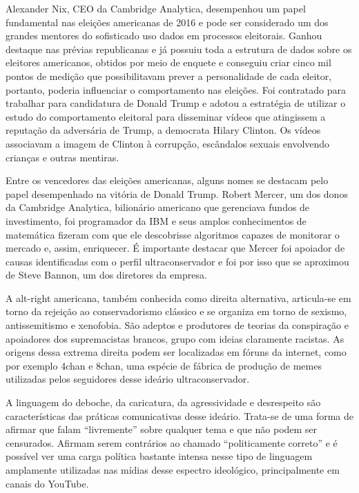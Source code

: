 Alexander Nix, CEO da Cambridge Analytica, desempenhou um papel
fundamental nas eleições americanas de 2016 e pode ser considerado um
dos grandes mentores do sofisticado uso dados em processos eleitorais.
Ganhou destaque nas prévias republicanas e já possuiu toda a estrutura
de dados sobre os eleitores americanos, obtidos por meio de enquete e
conseguiu criar cinco mil pontos de medição que possibilitavam prever a
personalidade de cada eleitor, portanto, poderia influenciar o
comportamento nas eleições. Foi contratado para trabalhar para
candidatura de Donald Trump e adotou a estratégia de utilizar o estudo
do comportamento eleitoral para disseminar vídeos que atingissem a
reputação da adversária de Trump, a democrata Hilary Clinton. Os vídeos
associavam a imagem de Clinton à corrupção, escândalos sexuais
envolvendo crianças e outras mentiras.

Entre os vencedores das eleições americanas, alguns nomes se destacam
pelo papel desempenhado na vitória de Donald Trump. Robert Mercer, um
dos donos da Cambridge Analytica, bilionário americano que gerenciava
fundos de investimento, foi programador da IBM e seus amplos
conhecimentos de matemática fizeram com que ele descobrisse algoritmos
capazes de monitorar o mercado e, assim, enriquecer. É importante
destacar que Mercer foi apoiador de causas identificadas com o perfil
ultraconservador e foi por isso que se aproximou de Steve Bannon, um dos
diretores da empresa.

A alt-right americana, também conhecida como direita alternativa,
articula-se em torno da rejeição ao conservadorismo clássico e se
organiza em torno de sexismo, antissemitismo e xenofobia. São adeptos e
produtores de teorias da conspiração e apoiadores dos supremacistas
brancos, grupo com ideias claramente racistas. As origens dessa extrema
direita podem ser localizadas em fóruns da internet, como por exemplo
4chan e 8chan, uma espécie de fábrica de produção de memes utilizadas
pelos seguidores desse ideário ultraconservador.

A linguagem do deboche, da caricatura, da agressividade e desrespeito
são características das práticas comunicativas desse ideário. Trata-se
de uma forma de afirmar que falam ``livremente'' sobre qualquer tema e
que não podem ser censurados. Afirmam serem contrários ao chamado
``politicamente correto'' e é possível ver uma carga política bastante
intensa nesse tipo de linguagem amplamente utilizadas nas mídias desse
espectro ideológico, principalmente em canais do YouTube.

